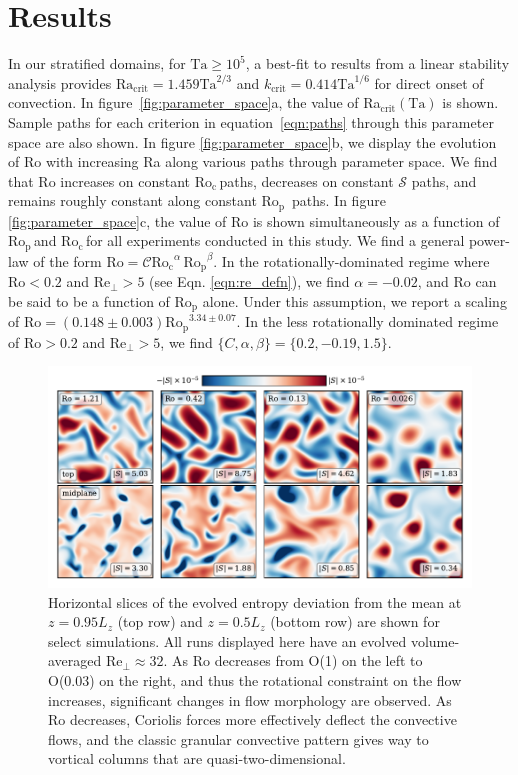 \documentclass[twocolumn, amsmath, amsfonts, amssymb, trackchanges]{aastex62}
\newcommand{\pro}{\ensuremath{\text{Ro}_{\text{p}}}}
\newcommand{\con}{\ensuremath{\text{Ro}_{\text{c}}}}
\begin{document}
\section{Results}
\label{sec:results}
In our stratified domains, for $\text{Ta} \geq 10^5$, 
a best-fit to results from a linear stability
analysis provides $\text{Ra}_{\text{crit}} = 1.459\text{Ta}^{2/3}$ 
and $k_{\text{crit}} = 0.414\text{Ta}^{1/6}$ for direct onset of convection.
In figure~\ref{fig:parameter_space}a, the value of Ra$_{\text{crit}}(\text{Ta})$
is shown. Sample paths for
each criterion in equation~\ref{eqn:paths} through
this parameter space are also shown.
In figure \ref{fig:parameter_space}b, we display the evolution of Ro
with increasing Ra along various paths through parameter space.
We find that Ro increases on constant \con$\,$paths, decreases on constant $\mathcal{S}$
paths, and remains roughly constant along constant \pro$\,$ paths.
In figure \ref{fig:parameter_space}c, the value of Ro is shown simultaneously as
a function of \pro$\,$and \con$\,$for all experiments conducted in this study.
We find a general power-law of the form \mbox{$\text{Ro} = \mathcal{C} \con^{\alpha}\,\pro^{\beta}$}.
In the rotationally-dominated regime where $\text{Ro} < 0.2$ and 
$\text{Re}_{\perp} > 5$ (see Eqn. \ref{eqn:re_defn}),
we find $\alpha = -0.02$, and $\text{Ro}$ can be said to be a function
of $\pro$ alone. Under this assumption, we report a scaling of $\text{Ro} = (0.148 \pm 0.003) \pro^{3.34 \pm 0.07}$.
In the less rotationally dominated regime of $\text{Ro} > 0.2$ and $\text{Re}_{\perp} > 5$, 
we find $\{C, \alpha, \beta\} = \{0.2, -0.19, 1.5\}$.




\begin{figure}[t]
    \includegraphics[width=\textwidth]{dynamics_plot.pdf}
    \caption{ Horizontal slices of the evolved entropy deviation from the mean
	at $z = 0.95L_z$ (top row) and $z = 0.5L_z$ (bottom row) are shown for select simulations. 
	All runs displayed here have an evolved volume-averaged $\text{Re}_\perp \approx 32$. 
    As Ro decreases from O(1) on the left to O(0.03) on the right, and thus the rotational
    constraint on the flow increases, significant changes in flow morphology are observed.
    As Ro decreases, Coriolis forces more effectively
    deflect the convective flows, and the classic granular convective pattern gives way
    to vortical columns that are quasi-two-dimensional.
    \label{fig:dynamics_plot} }
\end{figure}
\end{document}
